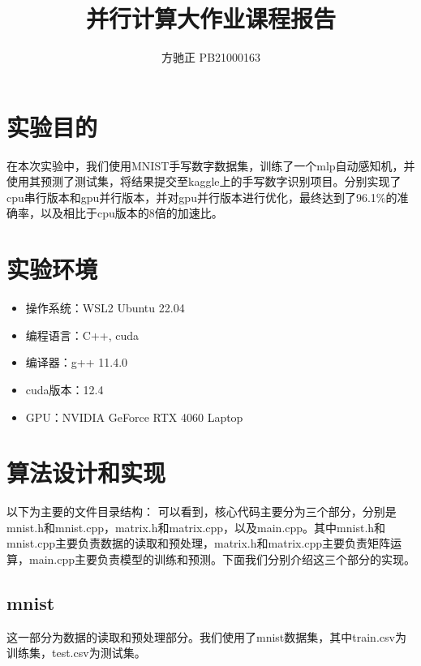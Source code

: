 \documentclass{ctexart}
\title{\textbf{并行计算大作业课程报告}}
\author{方驰正 PB21000163}
\begin{document}
\begin{sloppypar}

\maketitle




\section{实验目的}
在本次实验中，我们使用MNIST手写数字数据集，训练了一个mlp自动感知机，并使用其预测了测试集，将结果提交至kaggle上的手写数字识别项目。分别实现了cpu串行版本和gpu并行版本，并对gpu并行版本进行优化，最终达到了96.1\%的准确率，以及相比于cpu版本的8倍的加速比。

\section{实验环境}
\begin{itemize}
    \item 操作系统：WSL2 Ubuntu 22.04
    \item 编程语言：C++, cuda
    \item 编译器：g++ 11.4.0
    \item cuda版本：12.4
    \item GPU：NVIDIA GeForce RTX 4060 Laptop
\end{itemize}

\section{算法设计和实现}
以下为主要的文件目录结构：
可以看到，核心代码主要分为三个部分，分别是mnist.h和mnist.cpp，matrix.h和matrix.cpp，以及main.cpp。其中mnist.h和mnist.cpp主要负责数据的读取和预处理，matrix.h和matrix.cpp主要负责矩阵运算，main.cpp主要负责模型的训练和预测。下面我们分别介绍这三个部分的实现。

\subsection{mnist}
这一部分为数据的读取和预处理部分。我们使用了mnist数据集，其中train.csv为训练集，test.csv为测试集。


\end{sloppypar}
\end{document}
